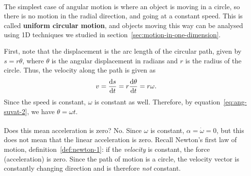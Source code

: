 \documentclass[../classical_mechanics.tex]{subfiles}
\begin{document}
        \paragraph{}
        The simplest case of angular motion is where an object is moving in a circle, so there is no motion in the radial direction, and going at a constant speed.
        This is called \textbf{uniform circular motion}, and objects moving this way can be analysed using 1D techniques we studied in section~\ref{sec:motion-in-one-dimension}.
        \begin{figure}[H]
            \centering
        \end{figure}
        First, note that the displacement is the arc length of the circular path, given by $s=r\theta$, where $\theta$ is the angular displacement in radians and $r$ is the radius of the circle.
        Thus, the velocity along the path is given as
        \begin{equation}\label{eq:ucm-speed}
            v=\dv{s}{t}=r\dv{\theta}{t}=r\omega.
        \end{equation}
        Since the speed is constant, $\omega$ is constant as well.
        Therefore, by equation~\ref{eq:ang-suvat-2}, we have $\theta=\omega t$.

        \paragraph{}
        Does this mean acceleration is zero?
        No.
        Since $\omega$ is constant, $\alpha=\dot{\omega}=0$, but this does not mean that the linear acceleration is zero.
        Recall Newton's first law of motion, definition~\ref{def:newton-1}: if the \textit{velocity} is constant, the force (acceleration) is zero.
        Since the path of motion is a circle, the velocity vector is constantly changing direction and is therefore \textit{not} constant.
\end{document}
